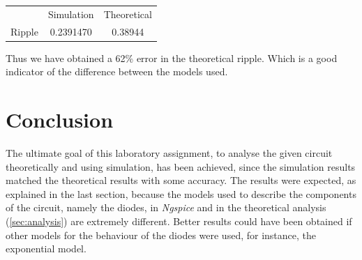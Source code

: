 \begin{center}
\begin{tabular}{ |c|c|c| }
 \hline 

  & Simulation & Theoretical \\
  Ripple &  0.2391470  &  0.38944 \\ 

  \hline 

\end{tabular}
\end{center}

Thus we have obtained a 62\% error in the theoretical ripple. Which is a 
good indicator of the difference between the models used. 

\section{Conclusion}
\label{sec:conclusion}


The ultimate goal of this laboratory assignment, to analyse
the given circuit theoretically and using simulation, has been achieved, since
the simulation results matched the theoretical results with some accuracy.
The results were expected, as explained in the last section, because 
the models used to describe the components of the circuit, namely the diodes, 
in \textit{Ngspice} and in the theoretical analysis (\ref{sec:analysis}) are 
extremely different. Better results could have been obtained if other 
models for the behaviour of the diodes were used, for instance, the 
exponential model.


